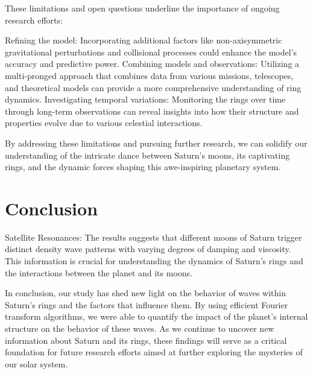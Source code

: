 \documentclass{article}
\begin{document}
These limitations and open questions underline the importance of ongoing research efforts:

Refining the model: Incorporating additional factors like non-axisymmetric gravitational perturbations and collisional processes could enhance the model's accuracy and predictive power.
Combining models and observations: Utilizing a multi-pronged approach that combines data from various missions, telescopes, and theoretical models can provide a more comprehensive understanding of ring dynamics.
Investigating temporal variations: Monitoring the rings over time through long-term observations can reveal insights into how their structure and properties evolve due to various celestial interactions.

By addressing these limitations and pursuing further research, we can solidify our understanding of the intricate dance between Saturn's moons, its captivating rings, and the dynamic forces shaping this awe-inspiring planetary system.







\section{Conclusion}

Satellite Resonances: The results suggests that different moons of Saturn trigger distinct density wave patterns with varying degrees of damping and viscosity. This information is crucial for understanding the dynamics of Saturn's rings and the interactions between the planet and its moons.

In conclusion, our study has shed new light on the behavior of waves within Saturn's rings and the factors that influence them. By using efficient Fourier transform algorithms, we were able to quantify the impact of the planet's internal structure on the behavior of these waves. As we continue to uncover new information about Saturn and its rings, these findings will serve as a critical foundation for future research efforts aimed at further exploring the mysteries of our solar system.
\end{document}
